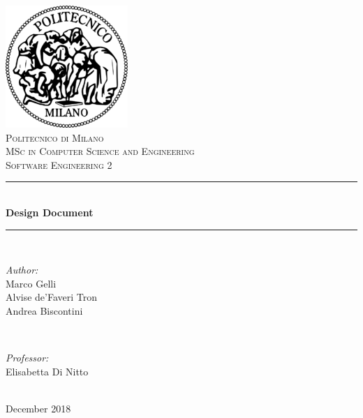 \begin{titlepage}
	\centering
    \vspace*{0.5 cm}
    
    \includegraphics[scale = 0.75]{images/logopoli.png}\\[1.0 cm]
    
    \textsc{\LARGE Politecnico di Milano}\\[2.0 cm]
	\textsc{\Large MSc in Computer Science and Engineering}\\[0.5 cm]
	\textsc{\large Software Engineering 2}\\[0.5 cm]
	
	\rule{\linewidth}{0.2 mm} \\[0.4 cm]
	{ \huge \bfseries Design Document}\\
	\rule{\linewidth}{0.2 mm} \\[1.5 cm]
	
	\begin{minipage}{0.5\textwidth}
		\begin{flushleft} \large
			\emph{Author:}\\
			Marco Gelli\\
			Alvise de'Faveri Tron\\
			Andrea Biscontini
		\end{flushleft}
	\end{minipage}
	~
	\begin{minipage}{0.5\textwidth}
		\begin{flushright} \large
			\emph{Professor:} \\
			Elisabetta Di Nitto
		\end{flushright}
	\end{minipage}\\[2 cm]
	
	{\large December 2018}\\[2 cm]
 
	\vfill
	
\end{titlepage}